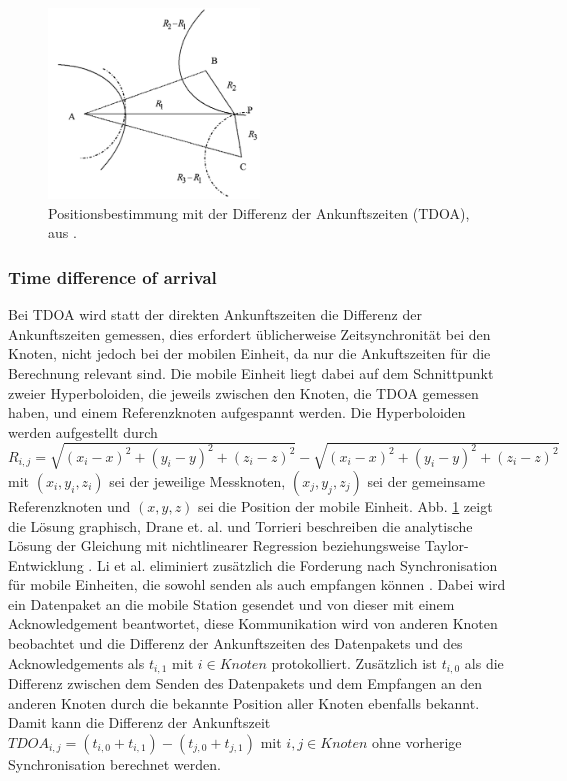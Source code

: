 \begin{figure}[h]
  \centering
	\includegraphics[width=0.5\textwidth]{images/tdoa.png}
  \caption{Positionsbestimmung mit der Differenz der Ankunftszeiten (TDOA), aus \cite{liu2007survey}.}
  \label{fig:tdoa}
\end{figure}


\subsubsection{Time difference of arrival}
Bei TDOA wird statt der direkten Ankunftszeiten die Differenz der Ankunftszeiten gemessen, dies erfordert üblicherweise Zeitsynchronität bei den Knoten, nicht jedoch bei der mobilen Einheit, da nur die Ankuftszeiten für die Berechnung relevant sind. Die mobile Einheit liegt dabei auf dem Schnittpunkt zweier Hyperboloiden, die jeweils zwischen den Knoten, die TDOA gemessen haben, und einem Referenzknoten aufgespannt werden. 
Die Hyperboloiden werden aufgestellt durch \\
$R_{i,j} = \sqrt{(x_i - x)^2 + (y_i - y)^2 + (z_i - z)^2} - \sqrt{(x_i - x)^2 + (y_i - y)^2 + (z_i - z)^2}$ mit $(x_i,y_i,z_i)$ sei der jeweilige Messknoten, $(x_j,y_j,z_j)$ sei der gemeinsame Referenzknoten und $(x,y,z)$ sei die Position der mobile Einheit. %
Abb. \ref{fig:tdoa} zeigt die Lösung graphisch, Drane et. al. und Torrieri beschreiben die analytische Lösung der Gleichung mit nichtlinearer Regression \cite{drane1998positioning} beziehungsweise Taylor-Entwicklung \cite{torrieri1984statistical}. 
Li et al. eliminiert zusätzlich die Forderung nach Synchronisation für mobile Einheiten, die sowohl senden als auch empfangen können \cite{li2000comparison}. 
Dabei wird ein Datenpaket an die mobile Station gesendet und von dieser mit einem Acknowledgement beantwortet, diese Kommunikation wird von anderen Knoten beobachtet und die Differenz der Ankunftszeiten des Datenpakets und des Acknowledgements als $t_{i,1}$ mit $i \in Knoten$ protokolliert. Zusätzlich ist $t_{i,0}$ als die Differenz zwischen dem Senden des Datenpakets und dem Empfangen an den anderen Knoten durch die bekannte Position aller Knoten ebenfalls bekannt. Damit kann die Differenz der Ankunftszeit $TDOA_{i,j} = (t_{i,0} + t_{i,1}) - (t_{j,0} + t_{j,1})$ mit $i,j \in Knoten$ ohne vorherige Synchronisation berechnet werden. \\


